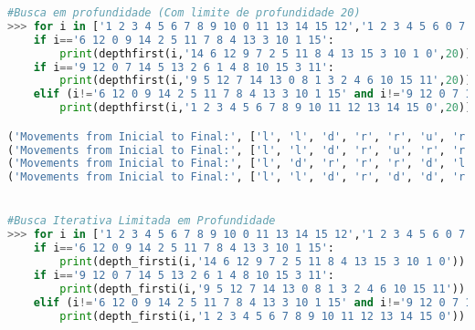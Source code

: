 \documentclass{article}
\begin{document}
\begin{lstlisting}[language = Python]
#Busca em profundidade (Com limite de profundidade 20)
>>> for i in ['1 2 3 4 5 6 7 8 9 10 0 11 13 14 15 12','1 2 3 4 5 6 0 7 9 10 11 8 13 14 15 12','1 2 3 4 5 0 7 8 9 6 10 12 13 14 11 15','1 2 3 0 5 6 8 4 9 10 7 12 13 14 11 15','1 2 3 4 5 0 6 8 9 11 7 12 13 10 14 15','1 2 3 4 5 10 6 7 9 0 12 8 13 14 11 15','6 12 0 9 14 2 5 11 7 8 4 13 3 10 1 15','1 0 3 4 6 2 7 8 5 14 10 12 9 13 11 15','1 6 2 4 5 10 3 8 13 9 7 11 14 0 15 12','1 2 3 4 5 6 8 12 13 9 0 7 14 11 10 15','9 12 0 7 14 5 13 2 6 1 4 8 10 15 3 11']:
	if i=='6 12 0 9 14 2 5 11 7 8 4 13 3 10 1 15':
		print(depthfirst(i,'14 6 12 9 7 2 5 11 8 4 13 15 3 10 1 0',20))
	if i=='9 12 0 7 14 5 13 2 6 1 4 8 10 15 3 11':
		print(depthfirst(i,'9 5 12 7 14 13 0 8 1 3 2 4 6 10 15 11',20))
	elif (i!='6 12 0 9 14 2 5 11 7 8 4 13 3 10 1 15' and i!='9 12 0 7 14 5 13 2 6 1 4 8 10 15 3 11'):
		print(depthfirst(i,'1 2 3 4 5 6 7 8 9 10 11 12 13 14 15 0',20))

('Movements from Inicial to Final:', ['l', 'l', 'd', 'r', 'r', 'u', 'r', 'u', 'l', 'd', 'd', 'l', 'l', 'u', 'r', 'r', 'u', 'r', 'd', 'd'], 'Seconds it took:', 11.549108982086182, 'Maximum space used:', 21)
('Movements from Inicial to Final:', ['l', 'l', 'd', 'r', 'u', 'r', 'r', 'd', 'l', 'u', 'l', 'd', 'l', 'u', 'r', 'r', 'd', 'r', 'd'], 'Seconds it took:', 42.63512134552002, 'Maximum space used:', 21)
('Movements from Inicial to Final:', ['l', 'd', 'r', 'r', 'r', 'd', 'l', 'l', 'u', 'l', 'u', 'r', 'd', 'd', 'r', 'r', 'u', 'l', 'd', 'r'], 'Seconds it took:', 0.689577579498291, 'Maximum space used:', 21)
('Movements from Inicial to Final:', ['l', 'l', 'd', 'r', 'd', 'd', 'r', 'u', 'l', 'u', 'l', 'u', 'r', 'r', 'd', 'l', 'd', 'r', 'd'], 'Seconds it took:', 109.79216718673706, 'Maximum space used:', 21)


#Busca Iterativa Limitada em Profundidade
>>> for i in ['1 2 3 4 5 6 7 8 9 10 0 11 13 14 15 12','1 2 3 4 5 6 0 7 9 10 11 8 13 14 15 12','1 2 3 4 5 0 7 8 9 6 10 12 13 14 11 15','1 2 3 0 5 6 8 4 9 10 7 12 13 14 11 15','1 2 3 4 5 0 6 8 9 11 7 12 13 10 14 15','1 2 3 4 5 10 6 7 9 0 12 8 13 14 11 15','6 12 0 9 14 2 5 11 7 8 4 13 3 10 1 15','1 0 3 4 6 2 7 8 5 14 10 12 9 13 11 15','1 6 2 4 5 10 3 8 13 9 7 11 14 0 15 12','1 2 3 4 5 6 8 12 13 9 0 7 14 11 10 15','9 12 0 7 14 5 13 2 6 1 4 8 10 15 3 11']:
	if i=='6 12 0 9 14 2 5 11 7 8 4 13 3 10 1 15':
		print(depth_firsti(i,'14 6 12 9 7 2 5 11 8 4 13 15 3 10 1 0'))
	if i=='9 12 0 7 14 5 13 2 6 1 4 8 10 15 3 11':
		print(depth_firsti(i,'9 5 12 7 14 13 0 8 1 3 2 4 6 10 15 11'))
	elif (i!='6 12 0 9 14 2 5 11 7 8 4 13 3 10 1 15' and i!='9 12 0 7 14 5 13 2 6 1 4 8 10 15 3 11'):
		print(depth_firsti(i,'1 2 3 4 5 6 7 8 9 10 11 12 13 14 15 0'))


\end{lstlisting}
\end{document}
